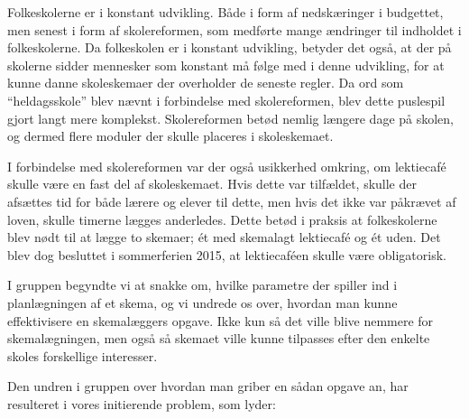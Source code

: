 Folkeskolerne er i konstant udvikling. Både i form af nedskæringer i budgettet, men senest i form af skolereformen, som medførte mange ændringer til indholdet i folkeskolerne. Da folkeskolen er i konstant udvikling, betyder det også, at der på skolerne sidder mennesker som konstant må følge med i denne udvikling, for at kunne danne skoleskemaer der overholder de seneste regler. Da ord som ``heldagsskole'' blev nævnt i forbindelse med skolereformen, blev dette puslespil gjort langt mere komplekst. Skolereformen betød nemlig længere dage på skolen, og dermed flere moduler der skulle placeres i skoleskemaet.

I forbindelse med skolereformen var der også usikkerhed omkring, om lektiecaf\'e skulle være en fast del af skoleskemaet. Hvis dette var tilfældet, skulle der afsættes tid for både lærere og elever til dette, men hvis det ikke var påkrævet af loven, skulle timerne lægges anderledes. Dette betød i praksis at folkeskolerne blev nødt til at lægge to skemaer; \'et med skemalagt lektiecaf\'e og \'et uden. Det blev dog besluttet i sommerferien 2015, at lektiecaf\'een skulle være obligatorisk\cite{Lektiecafe}.

I gruppen begyndte vi at snakke om, hvilke parametre der spiller ind i planlægningen af et skema, og vi undrede os over, hvordan man kunne effektivisere en skemalæggers opgave. Ikke kun så det ville blive nemmere for skemalægningen, men også så skemaet ville kunne tilpasses efter den enkelte skoles forskellige interesser.

Den undren i gruppen over hvordan man griber en sådan opgave an, har resulteret i vores initierende problem, som lyder: 



